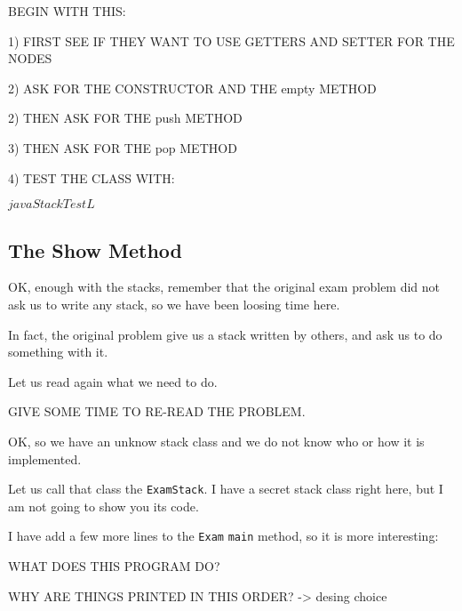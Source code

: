 \documentclass[a4paper, 9pt]{extarticle}
\newcommand{\separator}{\begin{center}%
\noindent\makebox[\linewidth]{\rule{0.75\paperwidth}{0.4pt}}%
\end{center}}
\begin{document}
\separator

\begin{multicols}{2}

BEGIN WITH THIS:


\columnbreak

1) FIRST SEE IF THEY WANT TO USE GETTERS AND SETTER FOR THE NODES

2) ASK FOR THE CONSTRUCTOR AND THE empty METHOD

2) THEN ASK FOR THE push METHOD

3) THEN ASK FOR THE pop METHOD

4) TEST THE CLASS WITH:

\begin{blackboard}
$ java StackTest L
$
\end{blackboard}
\end{multicols}

\newpage







\subsection{The Show Method}

OK, enough with the stacks, remember that the original exam problem did not ask
us to write any stack, so we have been loosing time here.

In fact, the original problem give us a stack written by others, and ask us to
do something with it.

Let us read again what we need to do.

GIVE SOME TIME TO RE-READ THE PROBLEM.

OK, so we have an unknow stack class and we do not know who or how it is
implemented.

Let us call that class the \texttt{ExamStack}. I have a secret stack class
right here, but I am not going to show you its code.

I have add a few more lines to the \texttt{Exam} \texttt{main} method, so it is
more interesting:

\begin{multicols}{2}
\columnbreak
WHAT DOES THIS PROGRAM DO?

WHY ARE THINGS PRINTED IN THIS ORDER? -> desing choice
\end{multicols}
\end{document}
